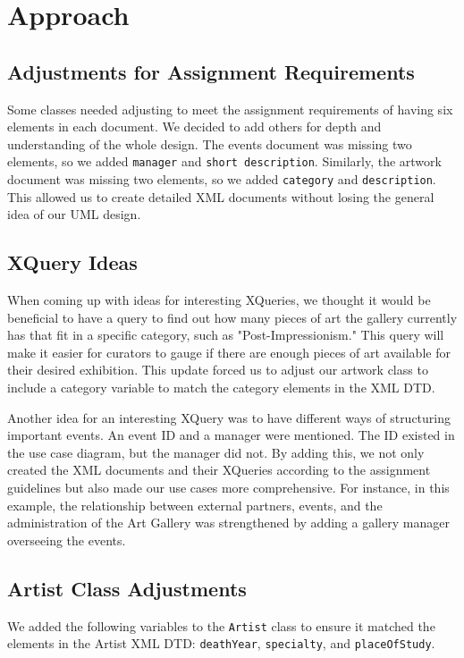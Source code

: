 \documentclass{article} %
\begin{document}
\newpage
\section{Approach} 
\subsection{Adjustments for Assignment Requirements}

Some classes needed adjusting to meet the assignment requirements of having six elements 
in each document. We decided to add others for depth and understanding of the whole 
design. The events document was missing two elements, so we added \texttt{manager} and 
\texttt{short description}. Similarly, the artwork document was missing two elements, so 
we added \texttt{category} and \texttt{description}. This allowed us to create detailed 
XML documents without losing the general idea of our UML design.

\subsection{XQuery Ideas}

When coming up with ideas for interesting XQueries, we thought it would be beneficial to 
have a query to find out how many pieces of art the gallery currently has that fit in a 
specific category, such as "Post-Impressionism." This query will make it easier for 
curators to gauge if there are enough pieces of art available for their desired exhibition. 
This update forced us to adjust our artwork class to include a category variable to match 
the category elements in the XML DTD.

Another idea for an interesting XQuery was to have different ways of structuring important 
events. An event ID and a manager were mentioned. The ID existed in the use case diagram, 
but the manager did not. By adding this, we not only created the XML documents and their 
XQueries according to the assignment guidelines but also made our use cases more 
comprehensive. For instance, in this example, the relationship between external partners, 
events, and the administration of the Art Gallery was strengthened by adding a gallery 
manager overseeing the events.

\subsection{Artist Class Adjustments}

We added the following variables to the \texttt{Artist} class to ensure it matched the 
elements in the Artist XML DTD: \texttt{deathYear}, \texttt{specialty}, and 
\texttt{placeOfStudy}.
\end{document}

